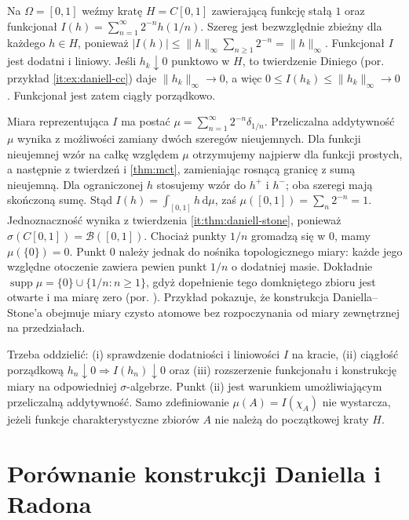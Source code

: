 \begin{przyklad}\label{prz:daniell-atoms}
Na $\Omega=[0,1]$ weźmy kratę $H=C[0,1]$ zawierającą funkcję stałą $1$ oraz funkcjonał
$I(h)=\sum_{n=1}^\infty 2^{-n}h(1/n)$. Szereg jest bezwzględnie zbieżny dla każdego $h\in H$, ponieważ $|I(h)|\le\|h\|_\infty\sum_{n\ge1}2^{-n}=\|h\|_\infty$. Funkcjonał $I$ jest dodatni i liniowy. Jeśli $h_k\downarrow0$ punktowo w $H$, to twierdzenie Diniego (por. przykład \ref{it:ex:daniell-cc}) daje $\|h_k\|_\infty\to0$, a więc $0\le I(h_k)\le\|h_k\|_\infty\to0$. Funkcjonał jest zatem ciągły porządkowo.

Miara reprezentująca $I$ ma postać $\mu=\sum_{n=1}^\infty 2^{-n}\delta_{1/n}$. Przeliczalna addytywność $\mu$ wynika z możliwości zamiany dwóch szeregów nieujemnych. Dla funkcji nieujemnej wzór na całkę względem $\mu$ otrzymujemy najpierw dla funkcji prostych, a następnie z twierdzeń  i \ref{thm:mct}, zamieniając rosnącą granicę z sumą nieujemną. Dla ograniczonej $h$ stosujemy wzór do $h^+$ i $h^-$; oba szeregi mają skończoną sumę. Stąd $I(h)=\int_{[0,1]}h\,\mathrm d\mu$, zaś $\mu([0,1])=\sum_n2^{-n}=1$. Jednoznaczność wynika z twierdzenia
\ref{it:thm:daniell-stone}, ponieważ
$\sigma(C[0,1])=\mathcal B([0,1])$.
Chociaż punkty $1/n$ gromadzą się w $0$, mamy
$\mu(\{0\})=0$. Punkt $0$ należy jednak do nośnika
topologicznego miary: każde jego względne otoczenie
zawiera pewien punkt $1/n$ o dodatniej masie.
Dokładnie $\operatorname{supp}\mu=\{0\}\cup\{1/n:n\ge1\}$,
gdyż dopełnienie tego domkniętego zbioru jest otwarte
i ma miarę zero (por.
). Przykład pokazuje, że konstrukcja Daniella--Stone'a obejmuje miary czysto atomowe bez rozpoczynania od miary zewnętrznej na przedziałach.
\end{przyklad}
\begin{uwaga}
Trzeba oddzielić: (i) sprawdzenie dodatniości i liniowości $I$ na kracie, (ii) ciągłość porządkową $h_n\downarrow0\Rightarrow I(h_n)\downarrow0$ oraz (iii) rozszerzenie funkcjonału i konstrukcję miary na odpowiedniej $\sigma$-algebrze. Punkt (ii) jest warunkiem umożliwiającym przeliczalną addytywność. Samo zdefiniowanie $\mu(A)=I(\chi_A)$ nie wystarcza, jeżeli funkcje charakterystyczne zbiorów $A$ nie należą do początkowej kraty $H$.
\end{uwaga}

\section{Porównanie konstrukcji Daniella i Radona}

